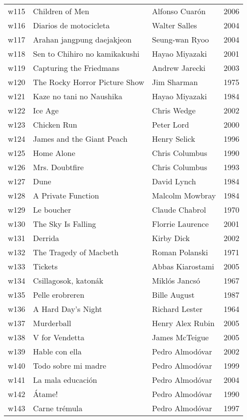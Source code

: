 \documentclass{article}
\begin{document}
\begin {center}
\begin{longtable}{l p{10cm} l l}
w115 & Children of Men & Alfonso Cuarón & 2006 \\
w116 & Diarios de motocicleta & Walter Salles & 2004 \\
w117 & Arahan jangpung daejakjeon & Seung-wan Ryoo & 2004 \\
w118 & Sen to Chihiro no kamikakushi & Hayao Miyazaki & 2001 \\
w119 & Capturing the Friedmans & Andrew Jarecki & 2003 \\
w120 & The Rocky Horror Picture Show & Jim Sharman & 1975 \\
w121 & Kaze no tani no Naushika & Hayao Miyazaki & 1984 \\
w122 & Ice Age & Chris Wedge & 2002 \\
w123 & Chicken Run & Peter Lord & 2000 \\
w124 & James and the Giant Peach & Henry Selick & 1996 \\
w125 & Home Alone & Chris Columbus & 1990 \\
w126 & Mrs. Doubtfire & Chris Columbus & 1993 \\
w127 & Dune & David Lynch & 1984 \\
w128 & A Private Function & Malcolm Mowbray & 1984 \\
w129 & Le boucher & Claude Chabrol & 1970 \\
w130 & The Sky Is Falling & Florrie Laurence & 2001 \\
w131 & Derrida & Kirby Dick & 2002 \\
w132 & The Tragedy of Macbeth & Roman Polanski & 1971 \\
w133 & Tickets & Abbas Kiarostami & 2005 \\
w134 & Csillagosok, katonák & Miklós Jancsó & 1967 \\
w135 & Pelle erobreren & Bille August & 1987 \\
w136 & A Hard Day's Night & Richard Lester & 1964 \\
w137 & Murderball & Henry Alex Rubin & 2005 \\
w138 & V for Vendetta & James McTeigue & 2005 \\
w139 & Hable con ella & Pedro Almodóvar & 2002 \\
w140 & Todo sobre mi madre & Pedro Almodóvar & 1999 \\
w141 & La mala educación & Pedro Almodóvar & 2004 \\
w142 & Átame! & Pedro Almodóvar & 1990 \\
w143 & Carne trémula & Pedro Almodóvar & 1997 \\

\end{longtable}
\end{center}
\end{document}
